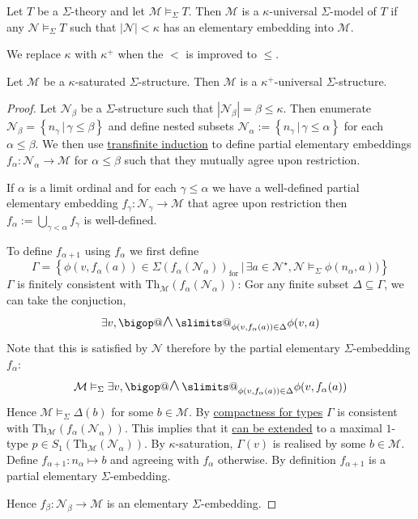 \documentclass{book}
\makeatletter
\DeclareRobustCommand\bigop[1]{%
  \mathop{\vphantom{\sum}\mathpalette\bigop@{#1}}\slimits@
}
\newcommand{\bigop@}[2]{%
  \vcenter{%
    \sbox\z@{$#1\sum$}%
    \hbox{\resizebox{
      \ifx#1\displaystyle.7\fi\dimexpr\ht\z@+\dp\z@}{!}{$\m@th#2$}}%
  }%
}
\newcommand{\bigand}[2]{\DOTSB\bigop{\mbox{\Large$\land$}}_{#1}^{#2}}
\newcommand{\set}[1]{\left\{#1\right\}}
\newcommand{\st}{\,|\,}
\newcommand{\subs}{\subseteq}
\newcommand{\al}{\alpha}
\newcommand{\be}{\beta}
\newcommand{\ga}{\gamma}
\newcommand{\ka}{\kappa}
\newcommand{\Ga}{\Gamma}
\newcommand{\De}{\Delta}
\newcommand{\Si}{\Sigma}
\newcommand{\MM}{\mathcal{M}}
\newcommand{\NN}{\mathcal{N}}
\newcommand{\abs}[1]{\left\vert #1 \right\vert}
\newcommand{\<}{\langle}
\renewcommand{\>}{\rangle}
\newcommand{\form}[1]{{#1}_\mathrm{for}}
\newcommand{\model}[1]{\vDash_{#1}}
\newcommand{\Theory}{\mathrm{Th}}
\newcommand{\linkto}[2]{\hyperlink{#1}{#2}}
\theoremstyle{definitionstyle}
\theoremstyle{exercisestyle}
\theoremstyle{remarkstyle}
\makeatother
\begin{document}
\begin{dfn}[$\ka$-universality]
    Let $T$ be a $\Si$-theory and let $\MM \model{\Si} T$.
    Then $\MM$ is a $\ka$-universal $\Si$-model of $T$ if 
    any $\NN \model{\Si} T$ such that $\abs{\NN} < \ka$ has an elementary 
    embedding into $\MM$.

    We replace $\ka$ with $\ka^+$ when the $<$ is improved to $\leq$.
\end{dfn}

\begin{lem}
    Let $\MM$ be a $\ka$-saturated $\Si$-structure.
    Then $\MM$ is a $\ka^+$-universal $\Si$-structure.
\end{lem}
\begin{proof}
    Let $\NN_\be$ be a $\Si$-structure such that 
    $\abs{\NN_\be} = \be \leq \ka$.
    Then enumerate $\NN_\be = \set{n_\ga \st \ga \leq \be}$
    and define nested subsets $\NN_\al := \set{n_\ga \st \ga \leq \al}$
    for each $\al \leq \be$.
    We then use \linkto{transfinite_induction}{transfinite induction} to define 
    partial elementary embeddings $f_\al : \NN_\al \to \MM$ 
    for $\al \leq \be$ such that they mutually agree upon restriction.

    If $\al$ is a limit ordinal and for each $\ga \leq \al$ we have 
    a well-defined partial elementary embedding $f_\ga : \NN_\ga \to \MM$ 
    that agree upon restriction
    then $f_\al := \bigcup_{\ga < \al} f_\ga$ is well-defined.

    To define $f_{\al+1}$ using $f_\al$ we first define 
    \[\Ga = \set{\phi(v,f_\al(a)) \in \form{\Si(f_\al(\NN_\al))} \st
    \exists a \in \NN^\star, \NN \model{\Si} \phi(n_\al,a))}\]
    $\Ga$ is finitely consistent with $\Theory_\MM(f_\al(\NN_\al))$:
    Gor any finite subset $\De \subs \Ga$,
    we can take the conjuction,
    \[\exists v, \bigand{\phi(v,f_\al(a)) \in \De}{} \phi(v,a)\]
    Note that this is satisfied by $\NN$ therefore by the partial elementary 
    $\Si$-embedding $f_\al$:
    \[\MM \model{\Si} \exists v, 
    \bigand{\phi(v,f_\al(a)) \in \De}{} \phi(v,f_\al(a))\]
    Hence $\MM \model{\Si} \De(b)$ for some $b \in \MM$.
    By \linkto{compactness_for_types}{compactness for types}
    $\Ga$ is consistent with $\Theory_\MM(f_\al(\NN_\al))$.
    This implies that it 
    \linkto{extend_to_maximal_type_zorn}{can be extended} to a maximal $1$-type 
    $p \in S_1(\Theory_\MM(\NN_\al))$.
    By $\ka$-saturation, $\Ga(v)$ is realised by some 
    $b \in \MM$.
    Define $f_{\al + 1} : n_\al \mapsto b$ and agreeing with $f_\al$ otherwise.
    By definition $f_{\al + 1}$ is a partial elementary $\Si$-embedding.

    Hence $f_\be : \NN_\be \to \MM$ is an elementary $\Si$-embedding.
\end{proof}
\end{document}
